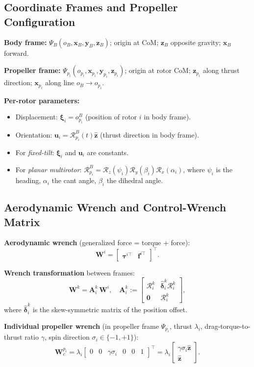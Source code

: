 \documentclass[11pt,a4paper]{article}
\newcommand{\vect}[1]{\bm{#1}}
\begin{document}
\subsection{Coordinate Frames and Propeller Configuration}

\textbf{Body frame:} $\Psi_B(o_B, \vect{x}_B, \vect{y}_B, \vect{z}_B)$; origin at CoM; $\vect{z}_B$ opposite gravity; $\vect{x}_B$ forward.

\textbf{Propeller frame:} $\Psi_{p_i}(o_{p_i}, \vect{x}_{p_i}, \vect{y}_{p_i}, \vect{z}_{p_i})$; origin at rotor CoM; $\vect{z}_{p_i}$ along thrust direction; $\vect{x}_{p_i}$ along line $o_B\to o_{p_i}$.

\textbf{Per-rotor parameters:}
\begin{itemize}
  \item Displacement: $\vect{\xi}_i = o_{p_i}^B$ (position of rotor $i$ in body frame).
  \item Orientation: $\vect{u}_i = \mathcal{R}_{p_i}^B(t)\hat{\vect{z}}$ (thrust direction in body frame).
  \item For \emph{fixed-tilt}: $\vect{\xi}_i$ and $\vect{u}_i$ are constants.
  \item For \emph{planar multirotor}: $\mathcal{R}_{p_i}^B = \mathcal{R}_z(\psi_i)\mathcal{R}_y(\beta_i)\mathcal{R}_x(\alpha_i)$, where $\psi_i$ is the heading, $\alpha_i$ the cant angle, $\beta_i$ the dihedral angle.
\end{itemize}

\subsection{Aerodynamic Wrench and Control-Wrench Matrix}

\textbf{Aerodynamic wrench} (generalized force = torque + force):
\[
\mathbf{W}^i = \begin{bmatrix}\vect{\tau}^{i\top} & \vect{f}^{i\top}\end{bmatrix}^\top.
\]

\textbf{Wrench transformation} between frames:
\[
\mathbf{W}^k = \mathbf{A}_i^k\,\mathbf{W}^i,
\quad
\mathbf{A}_i^k :=
\begin{bmatrix}
\mathcal{R}_i^k & \hat{\vect{\delta}}_i^k\mathcal{R}_i^k\\
\mathbf{0} & \mathcal{R}_i^k
\end{bmatrix},
\]
where $\hat{\vect{\delta}}_i^k$ is the skew-symmetric matrix of the position offset.

\textbf{Individual propeller wrench} (in propeller frame $\Psi_{p_i}$, thrust $\lambda_i$, drag-torque-to-thrust ratio $\gamma$, spin direction $\sigma_i\in\{-1,+1\}$):
\[
\mathbf{W}_c^{p_i}
= \lambda_i\begin{bmatrix}0 & 0 & \gamma\sigma_i & 0 & 0 & 1\end{bmatrix}^\top
= \lambda_i\begin{bmatrix}\gamma\sigma_i\hat{\vect{z}}\\\hat{\vect{z}}\end{bmatrix}.
\]
\end{document}

